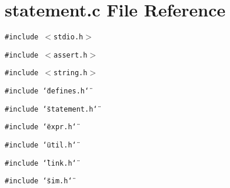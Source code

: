 \section{statement.c File Reference}
\label{statement_8c}
{\tt \#include $<$stdio.h$>$}\par
{\tt \#include $<$assert.h$>$}\par
{\tt \#include $<$string.h$>$}\par
{\tt \#include \char`\"{}defines.h\char`\"{}}\par
{\tt \#include \char`\"{}statement.h\char`\"{}}\par
{\tt \#include \char`\"{}expr.h\char`\"{}}\par
{\tt \#include \char`\"{}util.h\char`\"{}}\par
{\tt \#include \char`\"{}link.h\char`\"{}}\par
{\tt \#include \char`\"{}sim.h\char`\"{}}\par
